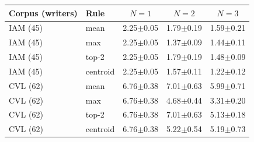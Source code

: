 \begin{tabular}{llccc}
\toprule
Corpus (writers) & Rule & $N{=}1$ & $N{=}2$ & $N{=}3$ \\
\midrule
IAM (45) & mean & 2.25$\pm$0.05 & 1.79$\pm$0.19 & 1.59$\pm$0.21 \\
IAM (45) & max & 2.25$\pm$0.05 & 1.37$\pm$0.09 & 1.44$\pm$0.11 \\
IAM (45) & top-2 & 2.25$\pm$0.05 & 1.79$\pm$0.19 & 1.48$\pm$0.09 \\
IAM (45) & centroid & 2.25$\pm$0.05 & 1.57$\pm$0.11 & 1.22$\pm$0.12 \\
\midrule
CVL (62) & mean & 6.76$\pm$0.38 & 7.01$\pm$0.63 & 5.99$\pm$0.71 \\
CVL (62) & max & 6.76$\pm$0.38 & 4.68$\pm$0.44 & 3.31$\pm$0.20 \\
CVL (62) & top-2 & 6.76$\pm$0.38 & 7.01$\pm$0.63 & 5.13$\pm$0.18 \\
CVL (62) & centroid & 6.76$\pm$0.38 & 5.22$\pm$0.54 & 5.19$\pm$0.73 \\
\bottomrule
\end{tabular}
